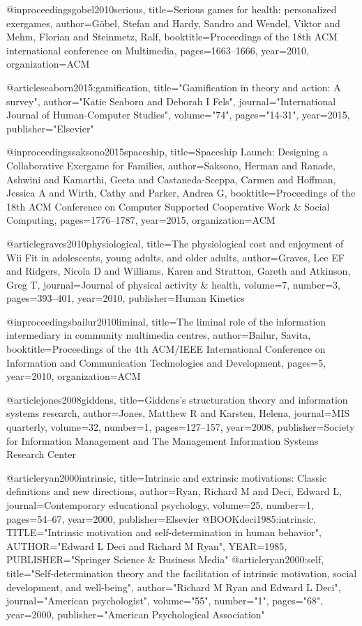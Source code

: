 @inproceedings{gobel2010serious,
  title={Serious games for health: personalized exergames},
  author={G{\"o}bel, Stefan and Hardy, Sandro and Wendel, Viktor and Mehm, Florian and Steinmetz, Ralf},
  booktitle={Proceedings of the 18th ACM international conference on Multimedia},
  pages={1663--1666},
  year={2010},
  organization={ACM}
}

@article{seaborn2015:gamification,
  title="Gamification in theory and action: A survey",
  author="Katie Seaborn and Deborah I Fels",
  journal="International Journal of Human-Computer Studies",
  volume="74",
  pages="14-31",
  year={2015},
  publisher="Elsevier"
}

@inproceedings{saksono2015spaceship,
  title={Spaceship Launch: Designing a Collaborative Exergame for Families},
  author={Saksono, Herman and Ranade, Ashwini and Kamarthi, Geeta and Castaneda-Sceppa, Carmen and Hoffman, Jessica A and Wirth, Cathy and Parker, Andrea G},
  booktitle={Proceedings of the 18th ACM Conference on Computer Supported Cooperative Work \& Social Computing},
  pages={1776--1787},
  year={2015},
  organization={ACM}
}

@article{graves2010physiological,
  title={The physiological cost and enjoyment of Wii Fit in adolescents, young adults, and older adults},
  author={Graves, Lee EF and Ridgers, Nicola D and Williams, Karen and Stratton, Gareth and Atkinson, Greg T},
  journal={Journal of physical activity \& health},
  volume={7},
  number={3},
  pages={393--401},
  year={2010},
  publisher={Human Kinetics}
}



@inproceedings{bailur2010liminal,
  title={The liminal role of the information intermediary in community multimedia centres},
  author={Bailur, Savita},
  booktitle={Proceedings of the 4th ACM/IEEE International Conference on Information and Communication Technologies and Development},
  pages={5},
  year={2010},
  organization={ACM}
}

@article{jones2008giddens,
  title={Giddens's structuration theory and information systems research},
  author={Jones, Matthew R and Karsten, Helena},
  journal={MIS quarterly},
  volume={32},
  number={1},
  pages={127--157},
  year={2008},
  publisher={Society for Information Management and The Management Information Systems Research Center}
}

@article{ryan2000intrinsic,
  title={Intrinsic and extrinsic motivations: Classic definitions and new directions},
  author={Ryan, Richard M and Deci, Edward L},
  journal={Contemporary educational psychology},
  volume={25},
  number={1},
  pages={54--67},
  year={2000},
  publisher={Elsevier}
}
@BOOK{deci1985:intrinsic,
  TITLE="Intrinsic motivation and self-determination in human behavior",
  AUTHOR="Edward L Deci and Richard M Ryan",
  YEAR={1985},
  PUBLISHER="Springer Science \& Business Media"
}
@article{ryan2000:self,
  title="Self-determination theory and the facilitation of intrinsic motivation, social development, and well-being",
  author="Richard M Ryan and Edward L Deci",
  journal="American psychologist",
  volume="55",
  number="1",
  pages="68",
  year={2000},
  publisher="American Psychological Association"
}

